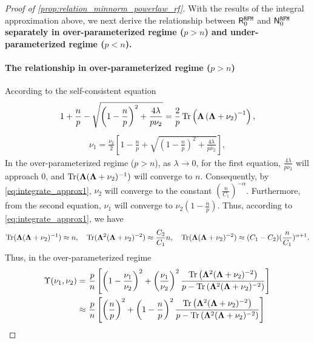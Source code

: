 \begin{proof}[Proof of \cref{prop:relation_minnorm_powerlaw_rf}]
With the results of the integral approximation above, we next derive the relationship between $\mathsf R_0^{\tt RFM}$ and $\mathsf N_0^{\tt RFM}$ {\bf separately in over-parameterized regime ($p > n$) and under-parameterized regime ($p < n$).}

\paragraph{The relationship in over-parameterized regime ($p > n$)}

According to the self-consistent equation
\[
\begin{aligned}
1 + \frac{n}{p} - \sqrt{\left( 1 - \frac{n}{p} \right)^2 + \frac{4\lambda}{p\nu_2}} = \frac{2}{p} \operatorname{Tr} \left( {\boldsymbol \Lambda} \left( {\boldsymbol \Lambda} + \nu_2 \right)^{-1} \right),
\end{aligned}
\]
\[
\begin{aligned}
\nu_1 = \frac{\nu_2}{2} \left[ 1 - \frac{n}{p} + \sqrt{\left( 1 - \frac{n}{p} \right)^2 + \frac{4\lambda}{p\nu_2}} \right],
\end{aligned}
\]
In the over-parameterized regime (\(p > n\)), as \(\lambda \to 0\), for the first equation, \(\frac{4\lambda}{p\nu_2}\) will approach \(0\), and \({\rm Tr}({\boldsymbol \Lambda}({\boldsymbol \Lambda} + \nu_2)^{-1})\) will converge to \(n\). Consequently, by \cref{eq:integrate_approx1}, \(\nu_2\) will converge to the constant \((\frac{n}{C_1})^{-\alpha}\). Furthermore, from the second equation, \(\nu_1\) will converge to \(\nu_2(1 - \frac{n}{p})\). Thus, according to \cref{eq:integrate_approx1}, we have
\[
\begin{aligned}
{\rm Tr}({\boldsymbol \Lambda} ({\boldsymbol \Lambda} + \nu_2)^{-1}) \approx n,\quad {\rm Tr}({\boldsymbol \Lambda}^2 ({\boldsymbol \Lambda} + \nu_2)^{-2}) \approx \frac{C_2}{C_1}n,\quad {\rm Tr}({\boldsymbol \Lambda} ({\boldsymbol \Lambda} + \nu_2)^{-2}) \approx (C_1-C_2) (\frac{n}{C_1})^{\alpha+1}.
\end{aligned}
\]
Thus, in the over-parameterized regime
\[
\begin{aligned}
\Upsilon(\nu_1, \nu_2) =&~ \frac{p}{n} \left[ \left( 1 - \frac{\nu_1}{\nu_2} \right)^2 + \left( \frac{\nu_1}{\nu_2} \right)^2 \frac{\operatorname{Tr}\left(\bLambda^2 (\bLambda + \nu_2)^{-2}\right)}{p - \operatorname{Tr}\left(\bLambda^2 (\bLambda + \nu_2)^{-2}\right)} \right]\\
\approx&~ \frac{p}{n} \left[ \left( \frac{n}{p} \right)^2 + \left( 1 - \frac{n}{p} \right)^2 \frac{\operatorname{Tr}\left(\bLambda^2 (\bLambda + \nu_2)^{-2}\right)}{p - \operatorname{Tr}\left(\bLambda^2 (\bLambda + \nu_2)^{-2}\right)} \right]\\

\end{aligned}\]
\end{proof}

